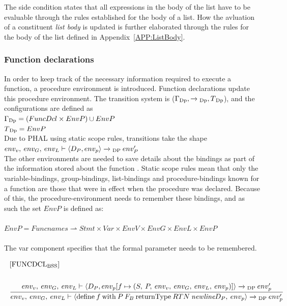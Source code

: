 \noindent
The side condition states that all expressions in the body of the list have to be evaluable through the rules established for the body of a list. How the avluation of a constituent \textit{list body} is updated is further elaborated through the rules for the body of the list defined in Appendix~\ref{APP:ListBody}.
\noindent
\subsubsection{Function declarations}
In order to keep track of the necessary information required to execute a function, a procedure environment is introduced. Function declarations update this procedure environment. The transition system is ($\Gamma \textsubscript{Dp}, \xrightarrow{}\textsubscript{Dp}, T \textsubscript{Dp}$), and the configurations are defined as\\
$\Gamma \textsubscript{Dp} = (FuncDcl \times EnvP) \cup EnvP $\\
$T\textsubscript{Dp} = EnvP$
\\
Due to PHAL using static scope rules, transitions take the shape
$env_v, \: env_G, \: env_L \vdash \langle D_P, env_p \rangle \xrightarrow{} \textsubscript{DP} \: env'_P$
\\ 
The other environments are needed to save details about the bindings as part of the information stored about the function \cite{PilenVedTraeetsRod}. Static scope rules mean that only the variable-bindings, group-bindings, list-bindings and procedure-bindings known for a function are those that were in effect when the procedure was declared. Because of this, the procedure-environment needs to remember these bindings, and as such the set $EnvP$ is defined as:
\\\\
$EnvP = Funcnames \rightharpoonup Stmt \times Var \times EnvV \times EnvG \times EnvL \times EnvP $
\\\\
The var component specifies that the formal parameter needs to be remembered.

\begin{equation}\label{rule:funcdclbss}
\begin{split}
\begin{minipage}{\linewidth}
$[\text{FUNCDCL}_\text{BSS}]$
\end{minipage}
\\\\
\begin{minipage}{\linewidth}
\centering
$\cfrac{env_v, \: env_G, \: env_L \vdash \langle D_P, env_p[f \mapsto (S, \: P, \: env_v, \: env_G, \: env_L, \: env_p)]\rangle \xrightarrow{}\textsubscript{DP} \: env'_p}{env_v, \: env_G, \: env_L \vdash \langle \text{define} \: f \: \text{with} \: P \: {F_B} \: \text{returnType} \: RTN \: \textit{newline} D_P, \: env_p\rangle \xrightarrow{}\textsubscript{DP} \: env_p'}$
\end{minipage}
\end{split}
\end{equation}

